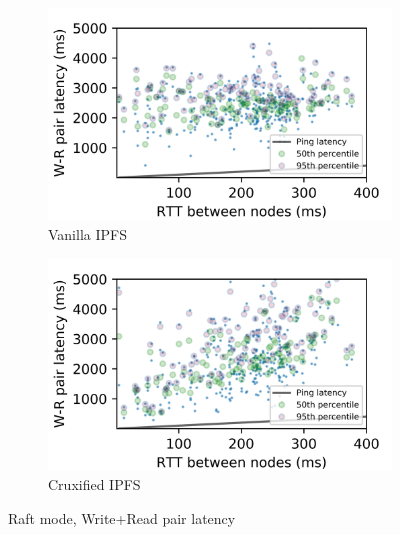 \documentclass[a4paper,11pt,oneside]{report}
\begin{document}
\begin{figure}[htbp!]
\centering
\begin{subfigure}{.5\textwidth}
  \centering
  \includegraphics[width=1\linewidth]{graphs/plot_zoom_vanilla_crdt.png}
  \caption{Vanilla IPFS}
  \label{fig:zoom1}
\end{subfigure}%
\begin{subfigure}{.5\textwidth}
  \centering
  \includegraphics[width=1\linewidth]{graphs/plot_zoom_cruxified_crdt.png}
  \caption{Cruxified IPFS}
  \label{fig:zoom2}
\end{subfigure}
\caption{Raft mode, Write+Read pair latency}
\label{fig:zoom}
\end{figure}
\end{document}
